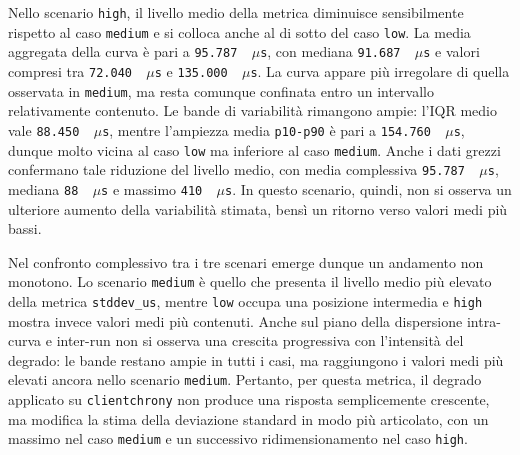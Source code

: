 Nello scenario \texttt{high}, il livello medio della metrica diminuisce
sensibilmente rispetto al caso \texttt{medium} e si colloca anche al di sotto del
caso \texttt{low}. La media aggregata della curva è pari a \texttt{95.787 \,$\mu$s},
con mediana \texttt{91.687 \,$\mu$s} e valori compresi tra \texttt{72.040 \,$\mu$s}
e \texttt{135.000 \,$\mu$s}. La curva appare più irregolare di quella osservata in
\texttt{medium}, ma resta comunque confinata entro un intervallo relativamente contenuto.
Le bande di variabilità rimangono ampie: l'IQR medio vale \texttt{88.450 \,$\mu$s},
mentre l'ampiezza media \texttt{p10-p90} è pari a \texttt{154.760 \,$\mu$s},
dunque molto vicina al caso \texttt{low} ma inferiore al caso \texttt{medium}. Anche
i dati grezzi confermano tale riduzione del livello medio, con media complessiva
\texttt{95.787 \,$\mu$s}, mediana \texttt{88 \,$\mu$s} e massimo \texttt{410 \,$\mu$s}.
In questo scenario, quindi, non si osserva un ulteriore aumento della variabilità
stimata, bensì un ritorno verso valori medi più bassi.

Nel confronto complessivo tra i tre scenari emerge dunque un andamento non
monotono. Lo scenario \texttt{medium} è quello che presenta il livello medio più
elevato della metrica \texttt{stddev\_us}, mentre \texttt{low} occupa una posizione
intermedia e \texttt{high} mostra invece valori medi più contenuti. Anche sul piano
della dispersione intra-curva e inter-run non si osserva una crescita progressiva
con l'intensità del degrado: le bande restano ampie in tutti i casi, ma raggiungono
i valori medi più elevati ancora nello scenario \texttt{medium}. Pertanto, per
questa metrica, il degrado applicato su \texttt{clientchrony} non produce una
risposta semplicemente crescente, ma modifica la stima della deviazione standard in
modo più articolato, con un massimo nel caso \texttt{medium} e un successivo ridimensionamento
nel caso \texttt{high}.


